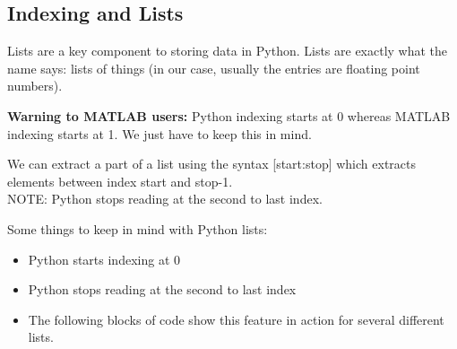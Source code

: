 \subsection{Indexing and Lists}
Lists are a key component to storing data in Python.  Lists are exactly what the name
says: lists of things (in our case, usually the entries are floating point numbers).  

{\bf Warning to MATLAB users:} Python indexing starts at 0 whereas MATLAB indexing starts
at 1. We just have to keep this in mind.

We can extract a part of a list using the syntax [start:stop] which extracts elements
between index start and stop-1.\\
NOTE: Python stops reading at the second to last index.

Some things to keep in mind with Python lists: 
\begin{itemize}
    \item Python starts indexing at 0
    \item Python stops reading at the second to last index
    \item The following blocks of code show this feature in action for several different lists.
\end{itemize}

